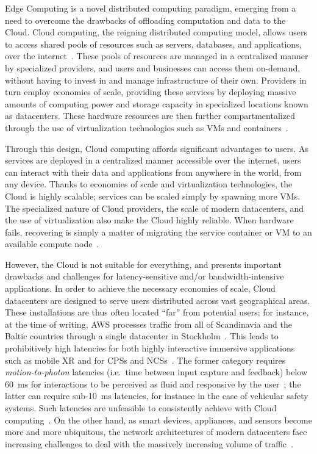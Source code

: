 Edge Computing is a novel distributed computing paradigm, emerging from a need to overcome the drawbacks of offloading computation and data to the Cloud.
Cloud computing, the reigning distributed computing model, allows users to access shared pools of resources such as servers, databases, and applications, over the internet~\cite{gai2012towards}.
These pools of resources are managed in a centralized manner by specialized providers, and users and businesses can access them on-demand, without having to invest in and manage infrastructure of their own.
Providers in turn employ economies of scale, providing these services by deploying massive amounts of computing power and storage capacity in specialized locations known as datacenters.
These hardware resources are then further compartmentalized through the use of virtualization technologies such as \glspl{VM} and containers~\cite{gai2012towards}.

Through this design, Cloud computing affords significant advantages to users.
As services are deployed in a centralized manner accessible over the internet, users can interact with their data and applications from anywhere in the world, from any device.
Thanks to economies of scale and virtualization technologies, the Cloud is highly scalable;
services can be scaled simply by spawning more \glspl{VM}.
The specialized nature of Cloud providers, the scale of modern datacenters, and the use of virtualization also make the Cloud highly reliable.
When hardware fails, recovering is simply a matter of migrating the service container or \gls{VM} to an available compute node~\cite{endo2016high}.

However, the Cloud is not suitable for everything, and presents important drawbacks and challenges for latency-sensitive and/or bandwidth-intensive applications.
In order to achieve the necessary economies of scale, Cloud datacenters are designed to serve users distributed across vast geographical areas.
These installations are thus often located ``far'' from potential users;
for instance, at the time of writing, \gls{AWS} processes traffic from all of Scandinavia and the Baltic countries through a single datacenter in Stockholm~\cite{awsregions}.
This leads to prohibitively high latencies for both highly interactive immersive applications such as mobile \gls{XR} and for \glspl{CPS} and \glspl{NCS}~\cite{tolia2006quantifying,lagar2007interactive,satyanarayanan2009case,varghese2016challenges,shi2016promise}.
The former category requires \emph{motion-to-photon} latencies (i.e.\ time between input capture and feedback) below \SI{60}{\milli\second} for interactions to be perceived as fluid and responsive by the user~\cite{chen2017empirical}; the latter can require sub-\SI{10}{\milli\second} latencies, for instance in the case of vehicular safety systems.
Such latencies are unfeasible to consistently achieve with Cloud computing~\cite{dang2021cloudy}.
On the other hand, as smart devices, appliances, and sensors become more and more ubiquitous, the network architectures of modern datacenters face increasing challenges to deal with the massively increasing volume of traffic~\cite{shi2016edge,wang2019towards}.

